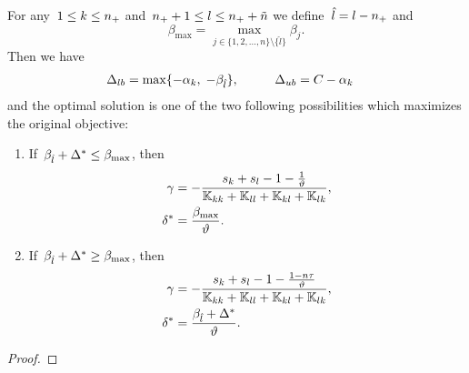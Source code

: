\begin{lemma}
  For any~$1 \le k \le n_{+}$ and~$n_{+} + 1 \le l \le n_{+} + \tilde{n}$ we define~$\hat{l} = l - n_{+}$ and
  \begin{equation*}
    \beta_{\max}
      = \max_{j \in \{1, 2, \ldots, n\} \setminus \{\hat{l}\}} \beta_j.
  \end{equation*}
  Then we have
  \begin{alignat*}{2}
    \Delta_{lb} & = \max\{- \alpha_k,\; -\beta_{\hat{l}} \}, & \qquad
    \Delta_{ub} & = C - \alpha_k
  \end{alignat*}
  and the optimal solution is one of the two following possibilities which maximizes the original objective:
  \begin{enumerate}
    \item If~$\beta_{\hat{l}} + \Delta^{*} \leq \beta_{\max}$, then
    \begin{align*}
      \gamma & = -\frac{s_k + s_l - 1 - \frac{1}{\vartheta}}{\mathbb{K}_{kk} + \mathbb{K}_{ll} + \mathbb{K}_{kl} + \mathbb{K}_{lk}}, \\
      \delta^{*} & = \frac{\beta_{\max}}{\vartheta}.
    \end{align*}
    \item If~$\beta_{\hat{l}} + \Delta^{*} \ge \beta_{\max}$, then
    \begin{align*}
      \gamma & = -\frac{s_k + s_l - 1 - \frac{1 - n\tau}{\vartheta}}{\mathbb{K}_{kk} + \mathbb{K}_{ll} + \mathbb{K}_{kl} + \mathbb{K}_{lk}}, \\
      \delta^{*} & = \frac{\beta_{\hat{l}} + \Delta^{*}}{\vartheta}.
    \end{align*}
  \end{enumerate}
\end{lemma}

\begin{proof}
\end{proof}

